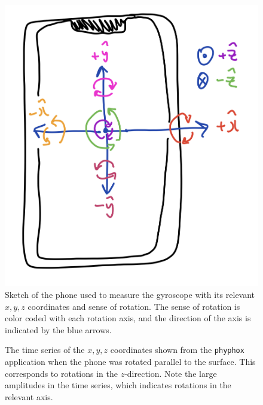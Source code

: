 \documentclass[a4paper]{report}
\numberwithin{equation}{section}
\begin{document}
\begin{figure}[hbt!]
	\centering
	\includegraphics[width=0.6\columnwidth]{Phone_sketch.png}

	\caption{Sketch of the phone used to measure the gyroscope with its relevant $x, y, z$ coordinates and sense of rotation. 
            The sense of rotation is color coded with each rotation axis, and the direction of the axis is indicated by the blue arrows.}
	\label{fig:phone_sketch}
\end{figure}

\begin{figure}[hbt!]
	\centering
	\quad

	\caption{The time series of the $x, y, z$ coordinates shown from the \texttt{phyphox} application when 
            the phone was rotated parallel to the surface. This corresponds to rotations in the $z$-direction. Note the large amplitudes in 
            the time series, which indicates rotations in the relevant axis. }
	\label{fig:gyro_plot_z}
\end{figure}
\end{document}
